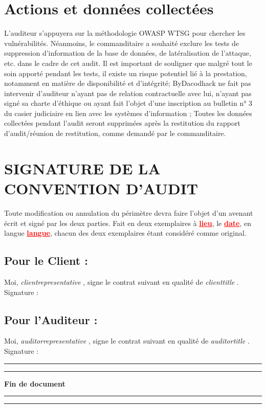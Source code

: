\documentclass[12pt]{extarticle}
\begin{document}
\chapter{Actions et données collectées}
    L’auditeur s’appuyera sur la méthodologie OWASP WTSG pour chercher les vulnérabilités. Néanmoins, le commanditaire a souhaité exclure les tests de suppression d’information de la base de données, de latéralisation de l’attaque, etc. dans le cadre de cet audit. Il est important de souligner que malgré tout le soin apporté pendant les tests, il existe un risque potentiel lié à la prestation, notamment en matière de disponibilité et d’intégrité;
    ByDacodhack ne fait pas intervenir d’auditeur n’ayant pas de relation contractuelle avec lui, n'ayant pas signé sa charte d’éthique ou ayant fait l’objet d’une inscription au bulletin n° 3 du casier judiciaire en lien avec les systèmes d’information ;
    Toutes les données collectées pendant l’audit seront supprimées après la restitution du rapport d’audit/réunion de restitution, comme demandé par le commanditaire.
\newpage
\chapter{SIGNATURE DE LA CONVENTION D'AUDIT}
    Toute modification ou annulation du périmètre devra faire l'objet d'un avenant écrit et signé par les deux parties.
    Fait en deux exemplaires à \textcolor{red}{\textbf{\underline{lieu}}}, le \textcolor{red}{\textbf{\underline{date}}}, en langue \textcolor{red}{\textbf{\underline{langue}}}, chacun des deux exemplaires étant considéré comme original.
    \section{Pour le Client :}
    Moi, \textit{ {{clientrepresentative}} }, signe le contrat suivant en qualité de \textit{ {{clienttitle}} }.
    \vspace{3cm}
    Signature :
    \section{Pour l'Auditeur :}
    Moi, \textit{ {{auditorrepresentative}} }, signe le contrat suivant en qualité de \textit{ {{auditortitle}} }.
    \vspace{3cm}
    Signature :
    \noindent\rule{\textwidth}{0.4pt}
    \vspace{1cm}
    \noindent\rule{\textwidth}{0.4pt}
    \begin{center}
        \Huge\textbf{Fin de document}
    \end{center}
    \vspace{1cm}
    \noindent\rule{\textwidth}{0.4pt}
    \vspace{1cm}
    \noindent\rule{\textwidth}{0.4pt}
\end{document}
